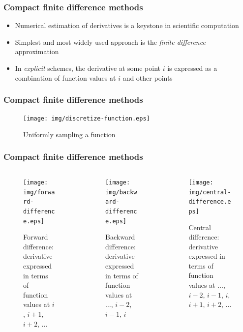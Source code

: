 \documentclass{beamer}
\begin{document}
\begin{frame}
\frametitle{Compact finite difference methods}
\pause
\begin{itemize}[<+->]
    \item Numerical estimation of derivatives
        is a keystone in scientific computation
    \item Simplest and most widely used approach
        is the \emph{finite difference} approximation
    \item In \emph{explicit} schemes,
        the derivative at some point $i$
        is expressed as a combination
        of function values at $i$ and other points
\end{itemize}
\end{frame}

\begin{frame}
\frametitle{Compact finite difference methods}
    \begin{figure}
    \texttt{[image: img/discretize-function.eps]}
    \caption{Uniformly sampling a function}
    \end{figure}
\end{frame}

\begin{frame}
\frametitle{Compact finite difference methods}
\begin{columns}[c]
     \begin{column}[T]{3cm}
        \begin{figure}
        \texttt{[image: img/forward-difference.eps]}
        \caption{Forward difference:
            derivative expressed in terms of function values
            at $i$, $i+1$, $i+2$, $\hdots$
        }
        \end{figure}
    \end{column}

     \begin{column}[T]{3cm}
        \begin{figure}
        \texttt{[image: img/backward-difference.eps]}
        \caption{Backward difference:
            derivative expressed in terms of function values
            at $\hdots$, $i-2$, $i-1$, $i$
        }
        \end{figure}
    \end{column}

    \begin{column}[T]{3cm}
        \begin{figure}
        \texttt{[image: img/central-difference.eps]}
        \caption{Central difference:
            derivative expressed in terms of function values
            at $\hdots$, $i-2$, $i-1$, $i$, $i+1$, $i+2$, $\hdots$
        }
        \end{figure}
    \end{column}
\end{columns}
\end{frame}
\end{document}
